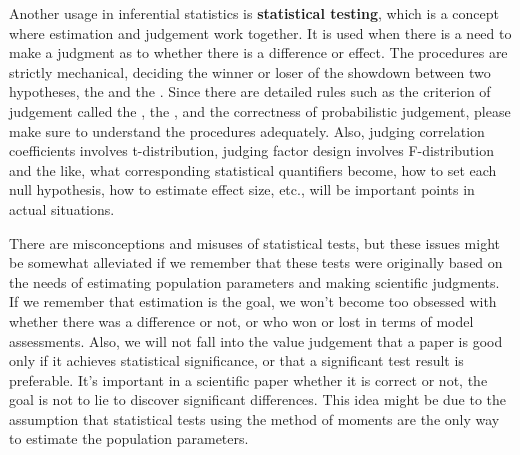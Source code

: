 \documentclass{ltjbook}
\begin{document}
Another usage in inferential statistics is \textbf{statistical testing}, which is a concept where estimation and judgement work together. It is used when there is a need to make a judgment as to whether there is a difference or effect. The procedures are strictly mechanical, deciding the winner or loser of the showdown between two hypotheses, the  and the . Since there are detailed rules such as the criterion of judgement called the , the , and the correctness of probabilistic judgement, please make sure to understand the procedures adequately. Also, judging correlation coefficients involves t-distribution, judging factor design involves F-distribution and the like, what corresponding statistical quantifiers become, how to set each null hypothesis, how to estimate effect size, etc., will be important points in actual situations.

There are misconceptions and misuses of statistical tests, but these issues might be somewhat alleviated if we remember that these tests were originally based on the needs of estimating population parameters and making scientific judgments. If we remember that estimation is the goal, we won't become too obsessed with whether there was a difference or not, or who won or lost in terms of model assessments. Also, we will not fall into the value judgement that a paper is good only if it achieves statistical significance, or that a significant test result is preferable. It's important in a scientific paper whether it is correct or not, the goal is not to lie to discover significant differences. This idea might be due to the assumption that statistical tests using the method of moments are the only way to estimate the population parameters.
\end{document}
